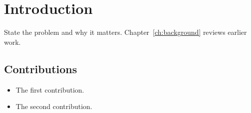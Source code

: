 \chapter{Introduction}\label{ch:intro}

State the problem and why it matters. Chapter~\ref{ch:background} reviews
earlier work.

\section{Contributions}

\begin{itemize}
  \item The first contribution.
  \item The second contribution.
\end{itemize}
